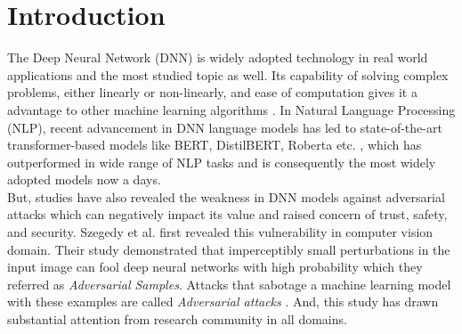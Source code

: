 \documentclass[%
	BCOR=8mm, %
	DIV=12,
	toc=bibliography, %
	toc=listof, %
	oneside, %
	egregdoesnotlikesansseriftitles, %
	]{scrbook}
\begin{document}








\tableofcontents
\listoffigures
\listoftables

% 
\newpage


\pagestyle{headings}
\setcapindent{0pt}



\chapter{Introduction}
The Deep Neural Network (DNN) is widely  adopted technology in real world applications and the most studied topic as well. Its capability of solving complex problems, either linearly or non-linearly, and ease of computation gives it a advantage to other machine learning algorithms \cite{huq_adversarial_2020}. In Natural Language Processing (NLP), recent advancement in DNN  language models  has led to state-of-the-art transformer-based models like BERT,  DistilBERT, Roberta etc. \cite{devlin_bert_2019-1,liu_roberta_2019-1,sanh_distilbert_2020,lan_albert_2020}, which has outperformed in wide range of NLP tasks  and is consequently the most widely adopted models now a days.\\
But, studies have also revealed the weakness in DNN models against adversarial attacks \cite{szegedy_intriguing_2014,yuan_adversarial_2018,akhtar_threat_2018,huq_adversarial_2020,zhang_adversarial_2019} which can negatively impact its value and raised concern of trust, safety, and security. Szegedy et al. \cite{szegedy_intriguing_2014} first revealed this vulnerability in computer vision domain. Their study demonstrated that imperceptibly small perturbations in the input image can fool deep neural networks with high probability which they referred  as \textit{Adversarial Samples}. Attacks that sabotage a machine learning model with these examples are called \textit{Adversarial attacks} \cite{nicolae_adversarial_2019}. And, this study has drawn substantial attention from research community in all domains. \\
\end{document}
